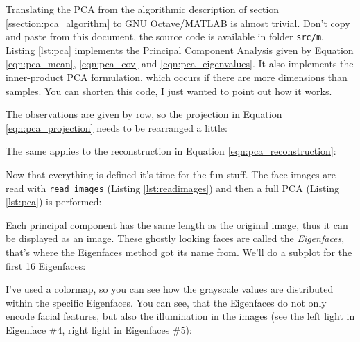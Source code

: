 Translating the PCA from the algorithmic description of section \ref{ssection:pca_algorithm} to \href{http://www.gnu.org/software/octave/}{GNU Octave}/\href{http://www.mathworks.com}{MATLAB} is almost trivial. Don't copy and paste from this document, the source code is available in folder \lstinline|src/m|. Listing \ref{lst:pca} implements the Principal Component Analysis given by Equation \ref{eqn:pca_mean}, \ref{eqn:pca_cov} and \ref{eqn:pca_eigenvalues}. It also implements the inner-product PCA formulation, which occurs if there are more dimensions than samples. You can shorten this code, I just wanted to point out how it works.



The observations are given by row, so the projection in Equation \ref{eqn:pca_projection} needs to be rearranged a little:



The same applies to the reconstruction in Equation \ref{eqn:pca_reconstruction}: 



Now that everything is defined it's time for the fun stuff. The face images are read with \lstinline|read_images| (Listing \ref{lst:readimages}) and then a full PCA (Listing \ref{lst:pca}) is performed:



Each principal component has the same length as the original image, thus it can be displayed as an image. These ghostly looking faces are called the \textit{Eigenfaces}, that's where the Eigenfaces method got its name from. We'll do a subplot for the first 16 Eigenfaces:



I've used a colormap, so you can see how the grayscale values are distributed within the specific Eigenfaces. You can see, that the Eigenfaces do not only encode facial features, but also the illumination in the images (see the left light in Eigenface \#4, right light in Eigenfaces \#5):

